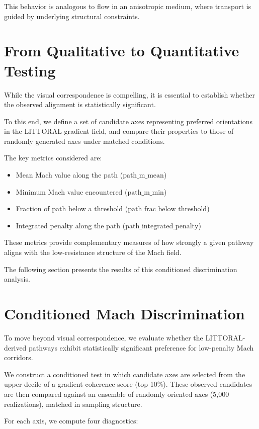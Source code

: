 \documentclass[twocolumn]{article}
\begin{document}
This behavior is analogous to flow in an anisotropic medium, where transport is guided by underlying structural constraints.

\section{From Qualitative to Quantitative Testing}

While the visual correspondence is compelling, it is essential to establish whether the observed alignment is statistically significant.

To this end, we define a set of candidate axes representing preferred orientations in the LITTORAL gradient field, and compare their properties to those of randomly generated axes under matched conditions.

The key metrics considered are:

\begin{itemize}
\item Mean Mach value along the path ($\text{path\_m\_mean}$)
\item Minimum Mach value encountered ($\text{path\_m\_min}$)
\item Fraction of path below a threshold ($\text{path\_frac\_below\_threshold}$)
\item Integrated penalty along the path ($\text{path\_integrated\_penalty}$)
\end{itemize}

These metrics provide complementary measures of how strongly a given pathway aligns with the low-resistance structure of the Mach field.

The following section presents the results of this conditioned discrimination analysis.


\section{Conditioned Mach Discrimination}

To move beyond visual correspondence, we evaluate whether the LITTORAL-derived pathways exhibit statistically significant preference for low-penalty Mach corridors.

We construct a conditioned test in which candidate axes are selected from the upper decile of a gradient coherence score (top 10\%). These observed candidates are then compared against an ensemble of randomly oriented axes (5,000 realizations), matched in sampling structure.

For each axis, we compute four diagnostics:
\end{document}
